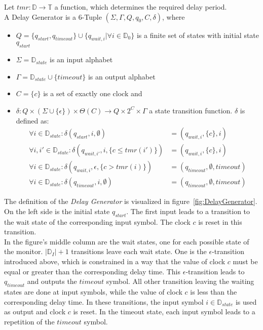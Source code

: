 		\begin{definition}
			Let $tmr: \mathbb{D}\rightarrow \mathbb{T}$ a function, which determines the required delay period.\\
			A Delay Generator is a 6-Tuple $(\Sigma, \Gamma, Q, q_0, C, \delta)$, where
			\begin{itemize}
				\item
					$Q = \{q_{start}, q_{timeout}\}\cup\{q_{wait,i} | \forall i\in \mathbb{D}_{0}\}$ is a finite set of states with initial state $q_{start}$
				\item
					$\Sigma = \mathbb D_{state}$ is an input alphabet
				\item
					$\Gamma = \mathbb D_{state} \cup \{timeout\}$ is an output alphabet
				\item
					$C=\{c\}$ is a set of exactly one clock and
				\item
					$\delta:Q\times(\Sigma\cup\{\epsilon\})\times\Theta(C)\rightarrow Q\times 2^C\times\Gamma$ a state transition function. $\delta$ is defined as:
					\begin{align}
						\forall i\in \mathbb{D}_{state}:\delta(q_{start}, i, \emptyset) &= (q_{wait,i}, \{c\}, i)\\
						\forall i, i'\in \mathbb{D}_{state}:\delta(q_{wait, i'}, i, \{c \leq tmr(i')\}) &= (q_{wait,i}, \{c\}, i)\\
						\forall i \in \mathbb{D}_{state}:\delta(q_{wait, i}, \epsilon, \{c > tmr(i)\}) &= (q_{timeout}, \emptyset, timeout)\\
						\forall i \in \mathbb{D}_{state}:\delta(q_{timeout}, i, \emptyset) &= (q_{timeout}, \emptyset, timeout)
					\end{align}
			\end{itemize}
		\end{definition}
		The definition of the \textit{Delay Generator} is visualized in figure~\ref{fig:DelayGenerator}. On the left side is the initial state $q_{start}$. The first input leads to a transition to the wait state of the corresponding input symbol. The clock $c$ is reset in this transition.\\
		In the figure's middle column are the wait states, one for each possible state of the monitor. $|\mathbb{D}_I|+1$ transitions leave each wait state. One is the $\epsilon$-transition introduced above, which is constrained in a way that the value of clock $c$ must be equal or greater than the corresponding delay time. This $\epsilon$-transition leads to $q_{timeout}$ and outputs the $timeout$ symbol. All other transition leaving the waiting states are done at input symbols, while the value of clock $c$ is less than the corresponding delay time. In these transitions, the input symbol $i\in \mathbb D_{state}$ is used as output and clock $c$ is reset. In the timeout state, each input symbol leads to a repetition of the $timeout$ symbol.
	
